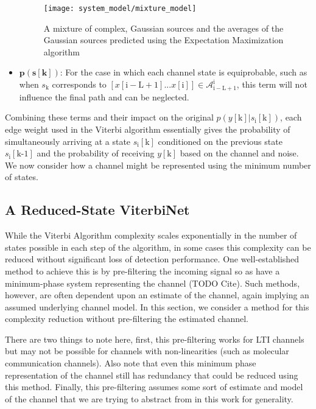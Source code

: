 \begin{itemize}

\begin{figure}[H]
\centering
	\texttt{[image: system\_model/mixture\_model]}
	  	  \caption{A mixture of complex, Gaussian sources and the averages of the Gaussian sources predicted using the Expectation Maximization algorithm}
	  \label{fig:mm}
\end{figure}

\item $\mathbf{p(s[\text{k}])}$: For the case in which each channel state is equiprobable, such as when $s_{\text{k}}$ corresponds to $\left[x[\mathrm{i-L+1}]...x[\mathrm{i}]\right] \in \mathcal{A}_{\mathrm{i-L+1}}^{\mathrm{i}}$, this term will not influence the final path and can be neglected.

\end{itemize}

Combining these terms and their impact on the original $p(y[\mathrm{k}]|s_{\text{i}}[\text{k}])$, each edge weight used in the Viterbi algorithm essentially gives the probability of simultaneously arriving at a state $s_{\text{i}}[\text{k}]$ conditioned on the previous state $s_{\text{i}}[\text{k-1}]$ and the probability of receiving $y[\mathrm{k}]$ based on the channel and noise. 
We now consider how a channel might be represented using the minimum number of states.

\subsection{A Reduced-State ViterbiNet}
While the Viterbi Algorithm complexity scales exponentially in the number of states possible in each step of the algorithm, in some cases this complexity can be reduced without significant loss of detection performance. One well-established method to achieve this is by pre-filtering the incoming signal so as have a minimum-phase system representing the channel (TODO Cite). Such methods, however, are often dependent upon an estimate of the channel, again implying an assumed underlying channel model. In this section, we consider a method for this complexity reduction without pre-filtering the estimated channel.

There are two things to note here, first, this pre-filtering works for LTI channels but may not be possible for channels with non-linearities (such as molecular communication channels). Also note that even this minimum phase representation of the channel still has redundancy that could be reduced using this method. Finally, this pre-filtering assumes some sort of estimate and model of the channel that we are trying to abstract from in this work for generality. 


